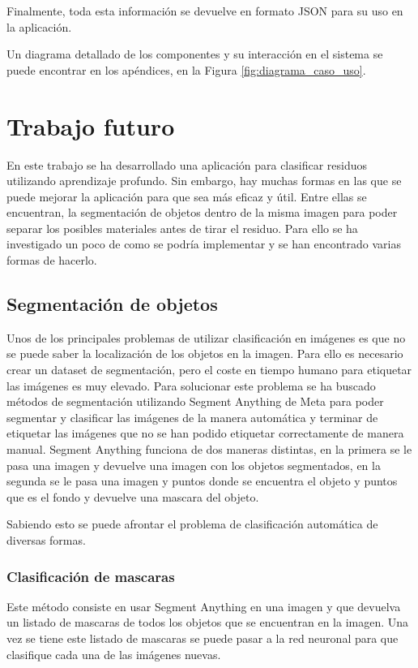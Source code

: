 \documentclass[10pt,a4paper,twocolumn,twoside]{article}
\begin{document}
Finalmente, toda esta información se devuelve en formato JSON para su uso en la aplicación.

Un diagrama detallado de los componentes y su interacción en el sistema se puede encontrar en los apéndices, en la Figura \ref{fig:diagrama_caso_uso}.

\section{Trabajo futuro}

En este trabajo se ha desarrollado una aplicación para clasificar residuos utilizando aprendizaje profundo. Sin embargo, hay muchas formas en las que se puede mejorar la aplicación para que sea más eficaz y útil. Entre
ellas se encuentran, la segmentación de objetos dentro de la misma imagen para poder separar los posibles materiales antes de tirar el residuo. Para ello se ha investigado
un poco de como se podría implementar y se han encontrado varias formas de hacerlo.

\subsection{Segmentación de objetos}

Unos de los principales problemas de utilizar clasificación en imágenes es que no se puede saber la localización de los objetos en la imagen. Para ello es necesario crear un dataset de segmentación, pero el coste en tiempo humano para etiquetar las imágenes es muy elevado.
Para solucionar este problema se ha buscado métodos de segmentación utilizando Segment Anything \cite{sammeta} de Meta para poder segmentar y clasificar las imágenes de la manera automática y terminar de etiquetar las imágenes que no se han podido etiquetar correctamente de manera manual.
Segment Anything funciona de dos maneras distintas, en la primera se le pasa una imagen y devuelve una imagen con los objetos segmentados, en la segunda se le pasa una imagen y puntos donde se encuentra el objeto y puntos que es el fondo y devuelve una mascara del objeto.

Sabiendo esto se puede afrontar el problema de clasificación automática de diversas formas.

\subsubsection{Clasificación de mascaras}

Este método consiste en usar Segment Anything en una imagen y que devuelva un listado de mascaras de todos los objetos que se encuentran en la imagen. Una vez se tiene este listado de mascaras se puede pasar a la red neuronal para que clasifique cada una de las imágenes nuevas.
\end{document}
